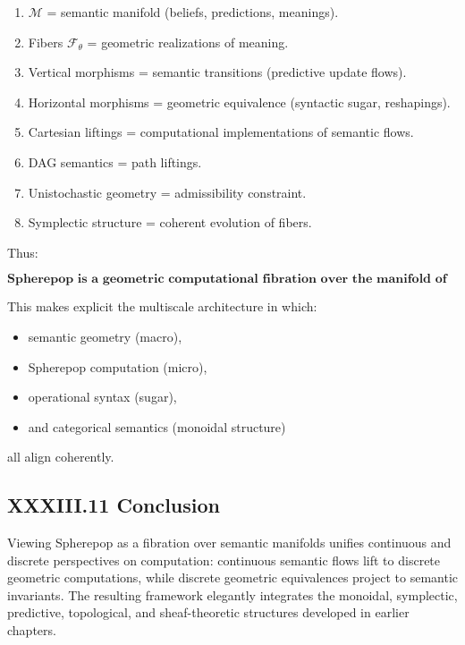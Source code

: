 \documentclass[12pt,letterpaper]{article}
\begin{document}
\begin{enumerate}
    \item $\mathcal{M}$ = semantic manifold (beliefs, predictions, meanings).
    \item Fibers $\mathcal{F}_\theta$ = geometric realizations of meaning.
    \item Vertical morphisms = semantic transitions (predictive update flows).
    \item Horizontal morphisms = geometric equivalence (syntactic sugar, reshapings).
    \item Cartesian liftings = computational implementations of semantic flows.
    \item DAG semantics = path liftings.
    \item Unistochastic geometry = admissibility constraint.
    \item Symplectic structure = coherent evolution of fibers.
\end{enumerate}

Thus:

\[
\boxed{
\textbf{Spherepop is a geometric computational fibration over the manifold of meaning.}
}
\]

This makes explicit the multiscale architecture in which:

\begin{itemize}
    \item semantic geometry (macro),
    \item Spherepop computation (micro),
    \item operational syntax (sugar),
    \item and categorical semantics (monoidal structure)
\end{itemize}

all align coherently.

\subsection{XXXIII.11 Conclusion}

Viewing Spherepop as a fibration over semantic manifolds unifies continuous and discrete perspectives on computation: continuous semantic flows lift to discrete geometric computations, while discrete geometric equivalences project to semantic invariants. The resulting framework elegantly integrates the monoidal, symplectic, predictive, topological, and sheaf-theoretic structures developed in earlier chapters.
\end{document}
